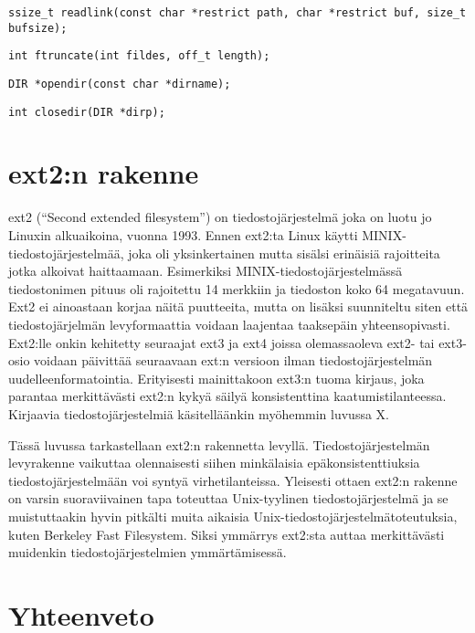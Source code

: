 \begin{verbatim}
ssize_t readlink(const char *restrict path, char *restrict buf, size_t bufsize);
\end{verbatim}

\begin{verbatim}
int ftruncate(int fildes, off_t length);
\end{verbatim}

\begin{verbatim}
DIR *opendir(const char *dirname);
\end{verbatim}

\begin{verbatim}
int closedir(DIR *dirp);
\end{verbatim}

\section{ext2:n rakenne}
ext2 (``Second extended filesystem'')  on tiedostojärjestelmä joka on luotu jo Linuxin alkuaikoina, vuonna 1993.
Ennen ext2:ta Linux käytti MINIX-tiedostojärjestelmää,
joka oli yksinkertainen mutta sisälsi erinäisiä rajoitteita jotka alkoivat haittaamaan.
Esimerkiksi MINIX-tiedostojärjestelmässä tiedostonimen pituus oli rajoitettu 14 merkkiin
ja tiedoston koko 64 megatavuun.
Ext2 ei ainoastaan korjaa näitä puutteeita,
mutta on lisäksi suunniteltu siten että tiedostojärjelmän levyformaattia voidaan laajentaa taaksepäin yhteensopivasti.
Ext2:lle onkin kehitetty seuraajat ext3 ja ext4 joissa olemassaoleva ext2- tai ext3-osio voidaan päivittää seuraavaan
ext:n versioon ilman tiedostojärjestelmän uudelleenformatointia.
Erityisesti mainittakoon ext3:n tuoma kirjaus, joka parantaa merkittävästi ext2:n kykyä säilyä konsistenttina kaatumistilanteessa.
Kirjaavia tiedostojärjestelmiä käsitelläänkin myöhemmin luvussa X.

Tässä luvussa tarkastellaan ext2:n rakennetta levyllä.
Tiedostojärjestelmän levyrakenne vaikuttaa olennaisesti siihen minkälaisia epäkonsistenttiuksia tiedostojärjestelmään voi syntyä virhetilanteissa.
Yleisesti ottaen ext2:n rakenne on varsin suoraviivainen tapa toteuttaa Unix-tyylinen tiedostojärjestelmä ja se muistuttaakin hyvin pitkälti muita aikaisia Unix-tiedostojärjestelmätoteutuksia, kuten Berkeley Fast Filesystem.
Siksi ymmärrys ext2:sta auttaa merkittävästi muidenkin tiedostojärjestelmien ymmärtämisessä.

\section{Yhteenveto}
